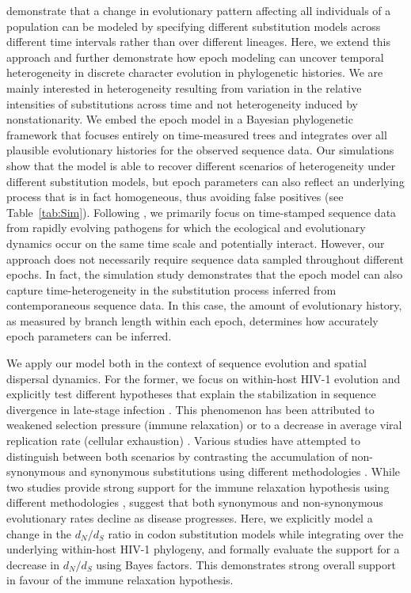 \citet{Goode2008} demonstrate that a change in evolutionary pattern affecting all individuals of a population can be modeled by specifying different substitution models across different time intervals rather than over different lineages.
Here, we extend this approach and further demonstrate how epoch modeling can uncover temporal heterogeneity in discrete character evolution in phylogenetic histories.
We are mainly interested in heterogeneity resulting from variation in the relative intensities of substitutions across time and not heterogeneity induced by nonstationarity.
We embed the epoch model in a Bayesian phylogenetic framework that focuses entirely on time-measured trees and integrates over all plausible evolutionary histories for the observed sequence data.
Our simulations show that the model is able to recover different scenarios of heterogeneity under different substitution models, but epoch parameters can also reflect an underlying process that is in fact homogeneous, thus avoiding false positives (see Table~\ref{tab:Sim}).
Following \citet{Goode2008}, we primarily focus on time-stamped sequence data from rapidly evolving pathogens for which the ecological and evolutionary dynamics occur on the same time scale and potentially interact.
However, our approach does not necessarily require sequence data sampled throughout different epochs.
In fact, the simulation study demonstrates that the epoch model can also capture time-heterogeneity in the substitution process inferred from contemporaneous sequence data. 
In this case, the amount of evolutionary history, as measured by branch length within each epoch, determines how accurately epoch parameters can be inferred.

We apply our model both in the context of sequence evolution and spatial dispersal dynamics.
For the former, we focus on within-host HIV-1 evolution and explicitly test different hypotheses that explain the stabilization in sequence divergence in late-stage infection \citep{Shankarappa1999}.
This phenomenon has been attributed to weakened selection pressure (immune relaxation) or to a decrease in average viral replication rate (cellular exhaustion) \citep{williamson2005}.
Various studies have attempted to distinguish between both scenarios by contrasting the accumulation of non-synonymous and synonymous  substitutions using different methodologies \citep{williamson2005,Lemey2007,Lee2008}.
While two studies provide strong support for the immune relaxation hypothesis using different methodologies \citep{williamson2005,Lemey2007}, \citet{Lee2008} suggest that both synonymous and non-synonymous evolutionary rates decline as disease progresses.
Here, we explicitly model a change in the $d_N/d_S$ ratio in codon substitution models while integrating over the underlying within-host HIV-1 phylogeny, and formally evaluate the support for a decrease in $d_N/d_S$ using Bayes factors. 
This demonstrates strong overall support in favour of the immune relaxation hypothesis.

